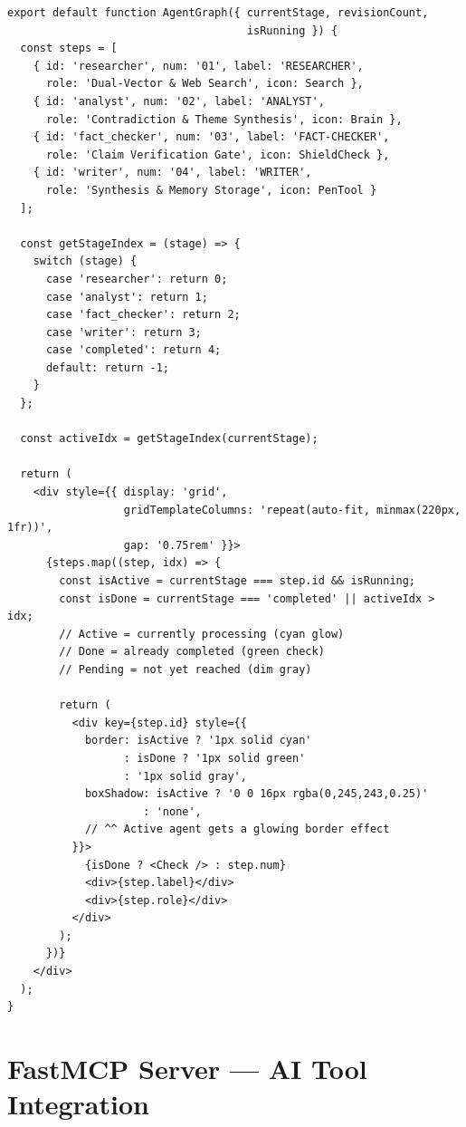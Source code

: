 \documentclass[11pt,a4paper,twoside]{report}
\begin{document}
\begin{lstlisting}[style=jsstyle,caption={AgentGraph.jsx --- Complete Code}]
export default function AgentGraph({ currentStage, revisionCount,
                                     isRunning }) {
  const steps = [
    { id: 'researcher', num: '01', label: 'RESEARCHER',
      role: 'Dual-Vector & Web Search', icon: Search },
    { id: 'analyst', num: '02', label: 'ANALYST',
      role: 'Contradiction & Theme Synthesis', icon: Brain },
    { id: 'fact_checker', num: '03', label: 'FACT-CHECKER',
      role: 'Claim Verification Gate', icon: ShieldCheck },
    { id: 'writer', num: '04', label: 'WRITER',
      role: 'Synthesis & Memory Storage', icon: PenTool }
  ];

  const getStageIndex = (stage) => {
    switch (stage) {
      case 'researcher': return 0;
      case 'analyst': return 1;
      case 'fact_checker': return 2;
      case 'writer': return 3;
      case 'completed': return 4;
      default: return -1;
    }
  };

  const activeIdx = getStageIndex(currentStage);

  return (
    <div style={{ display: 'grid',
                  gridTemplateColumns: 'repeat(auto-fit, minmax(220px, 1fr))',
                  gap: '0.75rem' }}>
      {steps.map((step, idx) => {
        const isActive = currentStage === step.id && isRunning;
        const isDone = currentStage === 'completed' || activeIdx > idx;
        // Active = currently processing (cyan glow)
        // Done = already completed (green check)
        // Pending = not yet reached (dim gray)

        return (
          <div key={step.id} style={{
            border: isActive ? '1px solid cyan'
                  : isDone ? '1px solid green'
                  : '1px solid gray',
            boxShadow: isActive ? '0 0 16px rgba(0,245,243,0.25)'
                     : 'none',
            // ^^ Active agent gets a glowing border effect
          }}>
            {isDone ? <Check /> : step.num}
            <div>{step.label}</div>
            <div>{step.role}</div>
          </div>
        );
      })}
    </div>
  );
}
\end{lstlisting}



\chapter{FastMCP Server --- AI Tool Integration}
\end{document}
